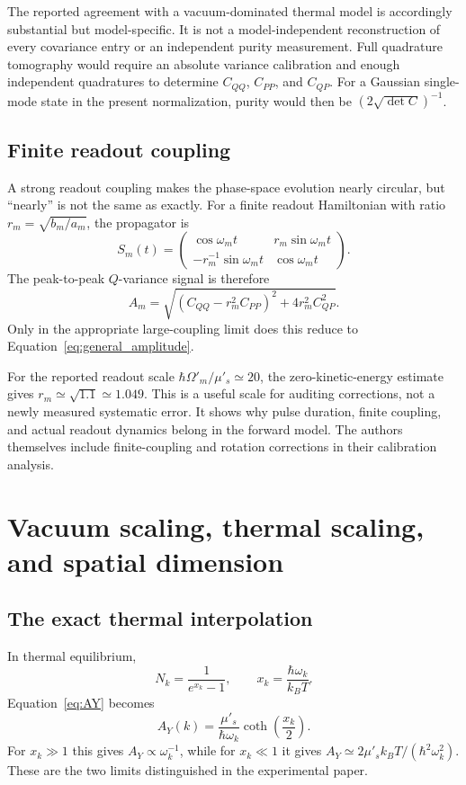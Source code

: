 \documentclass[11pt,a4paper]{article}
\theoremstyle{definition}
\theoremstyle{remark}
\newcommand{\musp}{\mu'_s}
\begin{document}
The reported agreement with a vacuum-dominated thermal model is accordingly substantial but model-specific. It is not a model-independent reconstruction of every covariance entry or an independent purity measurement. Full quadrature tomography would require an absolute variance calibration and enough independent quadratures to determine $C_{QQ}$, $C_{PP}$, and $C_{QP}$. For a Gaussian single-mode state in the present normalization, purity would then be $(2\sqrt{\det C})^{-1}$.\cite{zhang2026,weedbrook}

\subsection{Finite readout coupling}
A strong readout coupling makes the phase-space evolution nearly circular, but ``nearly'' is not the same as exactly. For a finite readout Hamiltonian with ratio $r_m=\sqrt{b_m/a_m}$, the propagator is
\begin{equation}
 S_m(t)=\begin{pmatrix}
 \cos\omega_mt&r_m\sin\omega_mt\\
 -r_m^{-1}\sin\omega_mt&\cos\omega_mt
 \end{pmatrix}.
 \label{eq:readoutS}
\end{equation}
The peak-to-peak $Q$-variance signal is therefore
\begin{equation}
 A_m=\sqrt{(C_{QQ}-r_m^2C_{PP})^2+4r_m^2C_{QP}^2}.
 \label{eq:finite_rotation}
\end{equation}
Only in the appropriate large-coupling limit does this reduce to Equation~\eqref{eq:general_amplitude}.

For the reported readout scale $\hbar\Omega'_m/\musp\simeq20$, the zero-kinetic-energy estimate gives $r_m\simeq\sqrt{1.1}\simeq1.049$. This is a useful scale for auditing corrections, not a newly measured systematic error. It shows why pulse duration, finite coupling, and actual readout dynamics belong in the forward model. The authors themselves include finite-coupling and rotation corrections in their calibration analysis.\cite{zhang2026}

\section{Vacuum scaling, thermal scaling, and spatial dimension}
\label{sec:spectrum}
\subsection{The exact thermal interpolation}
In thermal equilibrium,
\begin{equation}
 N_k=\frac{1}{e^{x_k}-1},\qquad
 x_k=\frac{\hbar\omega_k}{k_BT}.
 \label{eq:occupation}
\end{equation}
Equation~\eqref{eq:AY} becomes
\begin{equation}
 A_Y(k)=\frac{\musp}{\hbar\omega_k}
 \coth\!\left(\frac{x_k}{2}\right).
 \label{eq:coth}
\end{equation}
For $x_k\gg1$ this gives $A_Y\propto\omega_k^{-1}$, while for $x_k\ll1$ it gives $A_Y\simeq2\musp k_BT/(\hbar^2\omega_k^2)$. These are the two limits distinguished in the experimental paper.\cite{zhang2026}
\end{document}
